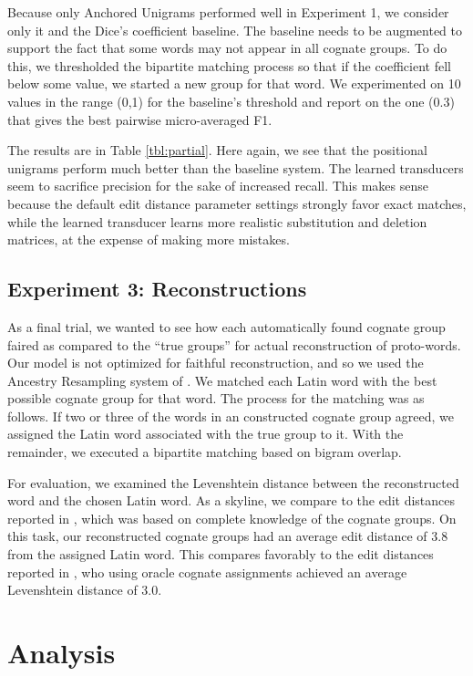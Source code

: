 \documentclass[11pt,a4paper]{article}
\begin{document}
Because only Anchored Unigrams performed well in Experiment 1, we
consider only it and the Dice's coefficient baseline. The baseline
needs to be augmented to support the fact that some words may not
appear in all cognate groups. To do this, we thresholded the bipartite
matching process so that if the coefficient fell below some value,
we started a new group for that word. We experimented on 10 values
in the range (0,1) for the baseline's threshold and report on the
one (0.3) that gives the best pairwise micro-averaged F1.

The results are in Table \ref{tbl:partial}. Here again, we see that
the positional unigrams perform much better than the baseline system.
The learned transducers seem to sacrifice precision for the sake
of increased recall. This makes sense because the default edit
distance parameter settings strongly favor exact matches, while the
learned transducer learns more realistic substitution and deletion
matrices, at the expense of making more mistakes.

\subsection{Experiment 3: Reconstructions}

As a final trial, we wanted to see how each automatically found
cognate group faired as compared to the ``true groups'' for actual
reconstruction of proto-words. Our model is not optimized for
faithful reconstruction, and so we used the Ancestry Resampling
system of . We matched each Latin word
with the best possible cognate group for that word. The process for
the matching was as follows. If two or three of the words in an
constructed cognate group agreed, we assigned the Latin word
associated with the true group to it. With the remainder, we executed
a bipartite matching based on bigram overlap.

For evaluation, we examined the Levenshtein distance between the
reconstructed word and the chosen Latin word. As a skyline, we
compare to the edit distances reported in ,
which was based on complete knowledge of the cognate groups. On
this task, our reconstructed cognate groups had an average edit
distance of 3.8 from the assigned Latin word. This compares favorably to the
edit distances reported in , who using oracle
cognate assignments achieved an average Levenshtein distance of 3.0.

\section{Analysis}
\end{document}
